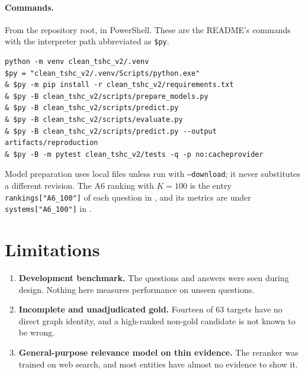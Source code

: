 \documentclass[11pt,a4paper]{article}
\theoremstyle{remark}
\newcommand{\code}[1]{\texttt{\small #1}}
\begin{document}
\paragraph{Commands.} From the repository root, in PowerShell. These are the README's
commands with the interpreter path abbreviated as \code{\$py}.

{\footnotesize
\begin{verbatim}
python -m venv clean_tshc_v2/.venv
$py = "clean_tshc_v2/.venv/Scripts/python.exe"
& $py -m pip install -r clean_tshc_v2/requirements.txt
& $py -B clean_tshc_v2/scripts/prepare_models.py
& $py -B clean_tshc_v2/scripts/predict.py
& $py -B clean_tshc_v2/scripts/evaluate.py
& $py -B clean_tshc_v2/scripts/predict.py --output artifacts/reproduction
& $py -B -m pytest clean_tshc_v2/tests -q -p no:cacheprovider
\end{verbatim}
}

\noindent Model preparation uses local files unless run with \code{--download}; it never
substitutes a different revision. The A6 ranking with $K=100$ is the entry
\code{rankings["A6\_100"]} of each question in
, and its metrics are under
\code{systems["A6\_100"]} in .

\section{Limitations}
\label{sec:limitations}

\begin{cautionbox}
\begin{enumerate}[leftmargin=*]
  \item \textbf{Development benchmark.} The questions and answers were seen during design.
        Nothing here measures performance on unseen questions.
  \item \textbf{Incomplete and unadjudicated gold.} Fourteen of 63 targets have no direct
        graph identity, and a high-ranked non-gold candidate is not known to be wrong.
  \item \textbf{General-purpose relevance model on thin evidence.} The reranker was
        trained on web search, and most entities have almost no evidence to show it.
\end{enumerate}
\end{cautionbox}
\end{document}
